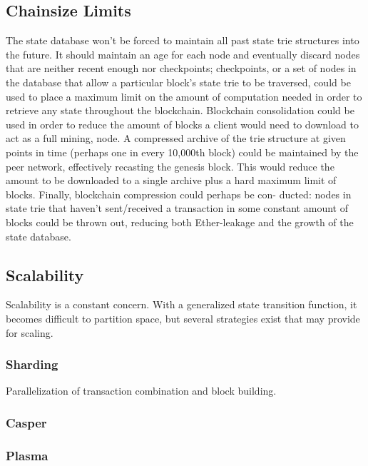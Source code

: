 \documentclass[10pt,a4paper,leqno,bibliography=totoc]{scrartcl}
\newenvironment{alphafootnotes}
{\par\edef\savedfootnotenumber{\number\value{footnote}}
\renewcommand{\thefootnote}{\alph{footnote}}
\setcounter{footnote}{0}}
{\par\setcounter{footnote}{\savedfootnotenumber}}
\begin{document}
\begin{alphafootnotes}
\begin{multicols*}{2}
		\subsection{Chainsize Limits} The state database won’t be forced to maintain all past state trie structures into the future. It should maintain an age for each node and eventually discard nodes that are neither recent enough nor checkpoints; checkpoints, or a set of nodes in the database that allow a particular block’s state trie to be traversed, could be used to place a maximum limit on the amount of computation needed in order to retrieve any state throughout the blockchain. Blockchain consolidation could be used in order to reduce the amount of blocks a client would need to download to act as a full mining, node. A compressed archive of the trie structure at given points in time (perhaps one in every 10,000th block) could be maintained by the peer network, effectively recasting the genesis block. This would reduce the amount to be downloaded to a single archive plus a hard maximum limit of blocks. Finally, blockchain compression could perhaps be con- ducted: nodes in state trie that haven’t sent/received a transaction in some constant amount of blocks could be thrown out, reducing both Ether-leakage and the growth of the state database.\supercite{Wood2017}
		\subsection{Scalability} Scalability is a constant concern. With a generalized state transition function, it becomes difficult to partition space, but several strategies exist that may provide for scaling.
		\subsubsection{Sharding}
		Parallelization of transaction combination and block building.
		\subsubsection{Casper}
		\subsubsection{Plasma}
		
			
	\end{multicols*}


\end{alphafootnotes}
\end{document}
